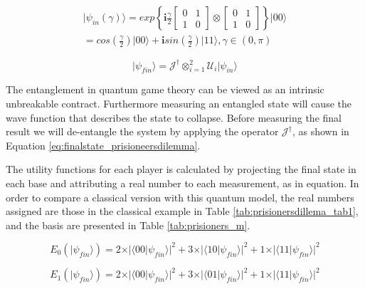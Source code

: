 \begin{equation}
\label{eq:estado_inicial_prisioneiro}
\begin{split}
\vert\psi_{in}(\gamma)\rangle=exp\left\{ \mathbf{i}\frac{\gamma}{2}\left[\begin{array}{cc}
0 & 1\\
1 & 0
\end{array}\right]\otimes\left[\begin{array}{cc}
0 & 1\\
1 & 0
\end{array}\right]\right\} \vert00\rangle \\
=cos(\frac{\gamma}{2})\vert00\rangle+\mathbf{i}sin(\frac{\gamma}{2})\vert11\rangle,\gamma\in(0,\pi)
\end{split}
\end{equation}

\begin{equation}
\vert\psi_{fin}\rangle= \mathcal{J}^{\dagger} \otimes_{i=1}^{2}\mathcal{U}_{i}\vert\psi_{in}\rangle
\label{eq:finalstate_prisioneersdilemma}
\end{equation}

The entanglement in quantum game theory can be viewed as an intrinsic unbreakable contract. Furthermore measuring an entangled state will cause the wave function that describes the state to collapse. Before measuring the final result we will de-entangle the system by applying the operator $\mathcal{J}^{\dagger}$, as shown in Equation \eqref{eq:finalstate_prisioneersdilemma}.

The utility functions for each player is calculated by projecting the final state in each base and attributing a real number to each measurement, as in equation.
In order to compare a classical version with this quantum model, the real numbers assigned are those in the classical example in Table \ref{tab:prisionersdillema_tab1}, and the basis are presented in Table \ref{tab:prisioners_m}.

\begin{equation}
E_{0}(\vert\psi_{fin}\rangle)=2\times\vert\langle00\vert\psi_{fin}\rangle\vert^{2}+3\times\vert\langle10\vert\psi_{fin}\rangle\vert^{2}+1\times\vert\langle11\vert\psi_{fin}\rangle\vert^{2}
\end{equation}


\begin{equation}
E_{1}(\vert\psi_{fin}\rangle)=2\times\vert\langle00\vert\psi_{fin}\rangle\vert^{2}+3\times\vert\langle01\vert\psi_{fin}\rangle\vert^{2}+1\times\vert\langle11\vert\psi_{fin}\rangle\vert^{2}
\end{equation}



